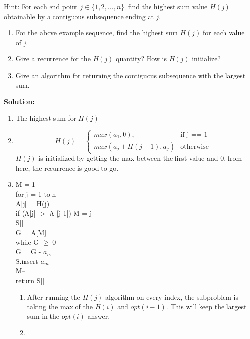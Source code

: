 \documentclass[11pt]{article}
\begin{document}
\begin{enumerate}
Hint: For each end point $j\in \{1,2,\ldots,n\}$, find
the highest sum value $H(j)$ obtainable by a contiguous subsequence
ending at $j$.
\begin{enumerate}
\item
For the above example sequence, find the highest sum $H(j)$
for each value of $j$.
\item
Give a recurrence for the $H(j)$  quantity?
How is $H(j)$ initialize?
\item
Give an algorithm for returning the
contiguous subsequence with the largest sum.
\end{enumerate}
\textbf{Solution:}\\
\begin{enumerate}
\item
The highest sum for $H(j)$:
\vspace*{3cm}
\item
\begin{equation}
H(j)=\begin{cases}
max (a_1, 0), & \text{if j == 1}\\
max (a_j + H(j-1), a_j) & \text{otherwise}
\end{cases}
\end{equation}
$H(j)$ is initialized by getting the max between the first value and 0, from here, the recurrence is good to go.
\item
M = 1\\
for j = 1 to n\\
\hspace*{1cm} A[j] = H(j)\\
\hspace*{1cm} if (A[j] $>$ A [j-1]) M = j\\
S[]\\
G = A[M]\\
while G $\geq$ 0\\
\hspace*{1cm} G = G - $a_m$\\
\hspace*{1cm} S.insert $a_m$\\
\hspace*{1cm} M--\\
return S[]\\
\begin{enumerate}
\item
After running the $H(j)$ algorithm on every index, the subproblem is taking the max of the $H(i)$ and $opt(i-1)$. This will keep the largest sum in the $opt(i)$ answer.
\item

\end{enumerate}
\end{enumerate}
\end{enumerate}
\end{document}
